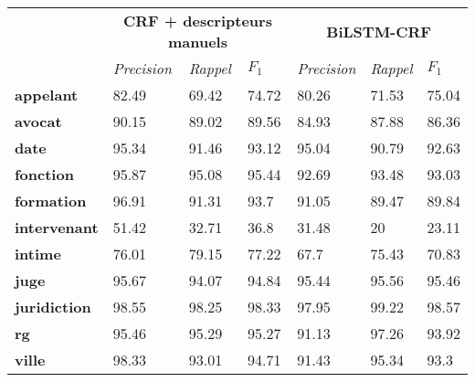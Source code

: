 \begin{table}[!ht]
	\footnotesize
	\centering
	\begin{tabular}{|l|l|l|l|l|l|l|}
		\hline
		&               \multicolumn{3}{c}{\textbf{CRF + descripteurs manuels}} & \multicolumn{3}{|c|}{\textbf{BiLSTM-CRF}}   \\ \cline{2-7}
		& \textit{Precision} & \textit{Rappel}                     & $F_1$ & \textit{Precision} & \textit{Rappel}      & $F_1$ \\ \hline
		\textbf{appelant}      & 82.49              & 69.42                               & 74.72       & 80.26              & 71.53                & 75.04       \\ 
		\textbf{avocat}        & 90.15              & 89.02                               & 89.56       & 84.93              & 87.88                & 86.36       \\ 
		\textbf{date}          & 95.34              & 91.46                               & 93.12       & 95.04              & 90.79                & 92.63       \\ 
		\textbf{fonction}      & 95.87              & 95.08                               & 95.44       & 92.69              & 93.48                & 93.03       \\ 
		\textbf{formation}     & 96.91              & 91.31                               & 93.7        & 91.05              & 89.47                & 89.84       \\ 
		\textbf{intervenant}   & 51.42              & 32.71                               & 36.8        & 31.48              & 20                   & 23.11       \\ 
		\textbf{intime}        & 76.01              & 79.15                               & 77.22       & 67.7               & 75.43                & 70.83       \\ 
		\textbf{juge}          & 95.67              & 94.07                               & 94.84       & 95.44              & 95.56                & 95.46       \\ 
		\textbf{juridiction}   & 98.55              & 98.25                               & 98.33       & 97.95              & 99.22                & 98.57       \\ 
		\textbf{rg}            & 95.46              & 95.29                               & 95.27       & 91.13              & 97.26                & 93.92       \\ 
		\textbf{ville}         & 98.33              & 93.01                               & 94.71       & 91.43              & 95.34                & 93.3        \\ 

\end{tabular}
\end{table}
